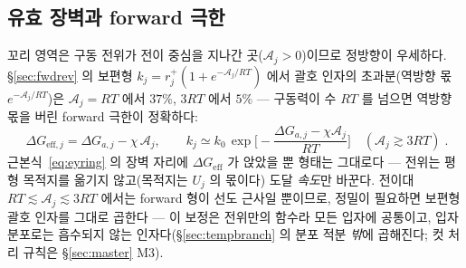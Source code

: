\documentclass[11pt,a4paper]{article}
\newcommand{\eff}{\mathrm{eff}}
\begin{document}
\subsection{유효 장벽과 forward 극한}
꼬리 영역은 구동 전위가 전이 중심을 지나간 곳($\mathcal A_j>0$)이므로 정방향이 우세하다.
\S\ref{sec:fwdrev} 의 보편형 $k_j=r_j^+(1+e^{-\mathcal A_j/RT})$ 에서 괄호 인자의 초과분(역방향
몫 $e^{-\mathcal A_j/RT}$)은 $\mathcal A_j=RT$ 에서 $37\%$, $3RT$ 에서 $5\%$ — 구동력이 수 $RT$ 를
넘으면 역방향 몫을 버린 forward 극한이 정확하다:
\begin{equation}
\boxed{\;\Delta G_{\eff,j}=\Delta G_{a,j}-\chi\,\mathcal A_j,\qquad
k_j\simeq k_0\,\exp\!\Big[-\frac{\Delta G_{a,j}-\chi\mathcal A_j}{RT}\Big]
\quad(\mathcal A_j\gtrsim3RT)\;.}
\label{eq:keff}
\end{equation}
근본식~\eqref{eq:eyring} 의 장벽 자리에 $\Delta G_{\eff}$ 가 앉았을 뿐 형태는 그대로다 — 전위는 평형
목적지를 옮기지 않고(목적지는 $U_j$ 의 몫이다) 도달 \emph{속도}만 바꾼다. 전이대
$RT\lesssim\mathcal A_j\lesssim3RT$ 에서는 forward 형이 선도 근사일 뿐이므로, 정밀이 필요하면 보편형
괄호 인자를 그대로 곱한다 — 이 보정은 전위만의 함수라 모든 입자에 공통이고, 입자 분포로는 흡수되지 않는
인자다(\S\ref{sec:tempbranch} 의 분포 적분 \emph{밖}에 곱해진다; 컷 처리 규칙은 \S\ref{sec:master}
M3).
\end{document}

